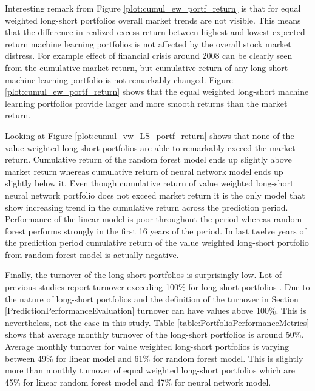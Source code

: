 \documentclass[12pt]{article}
\begin{document}
Interesting remark from Figure \ref{plot:cumul_ew_portf_return} is that for equal weighted long-short portfolios overall market trends are not visible. This means that the difference in realized excess return between highest and lowest expected return machine learning portfolios is not affected by the overall stock market distress. For example effect of financial crisis around 2008 can be clearly seen from the cumulative market return, but cumulative return of any long-short machine learning portfolio is not remarkably changed. Figure \ref{plot:cumul_ew_portf_return} shows that the equal weighted long-short machine learning portfolios provide larger and more smooth returns than the market return. \par

Looking at Figure \ref{plot:cumul_vw_LS_portf_return} shows that none of the value weighted long-short portfolios are able to remarkably exceed the market return. Cumulative return of the random forest model ends up slightly above market return whereas cumulative return of neural network model ends up slightly below it. Even though cumulative return of value weighted long-short neural network portfolio does not exceed market return it is the only model that show increasing trend in the cumulative return across the prediction period. Performance of the linear model is poor throughout the period whereas random forest performs strongly in the first 16 years of the period. In last twelve years of the prediction period cumulative return of the value weighted long-short portfolio from random forest model is actually negative. \par

Finally, the turnover of the long-short portfolios is surprisingly low. Lot of previous studies report turnover exceeding 100\% for long-short portfolios \citep[e.g.][]{guetal, TOBEK2021100588}. Due to the nature of long-short portfolios and the definition of the turnover in Section \ref{PredictionPerformanceEvaluation} turnover can have values above 100\%. This is nevertheless, not the case in this study. Table \ref{table:PortfolioPerformanceMetrics} shows that average monthly turnover of the long-short portfolios is around 50\%. Average monthly turnover for value weighted long-short portfolios is varying between 49\% for linear model and 61\% for random forest model. This is slightly more than monthly turnover of equal weighted long-short portfolios which are 45\% for linear random forest model and 47\% for neural network model. \par
\end{document}
